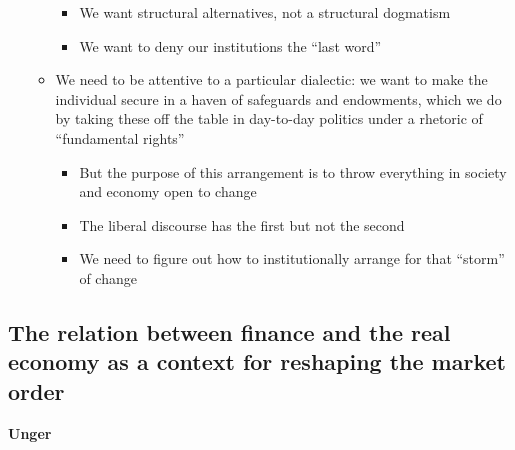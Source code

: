 \begin{itemize}
\begin{itemize}
    \begin{itemize}
    \tightlist
    \item
      We want structural alternatives, not a structural dogmatism
    \item
      We want to deny our institutions the ``last word''
    \end{itemize}
  \item
    We need to be attentive to a particular dialectic: we want to make
    the individual secure in a haven of safeguards and endowments, which
    we do by taking these off the table in day-to-day politics under a
    rhetoric of ``fundamental rights''

    \begin{itemize}
    \tightlist
    \item
      But the purpose of this arrangement is to throw everything in
      society and economy open to change
    \item
      The liberal discourse has the first but not the second
    \item
      We need to figure out how to institutionally arrange for that
      ``storm'' of change
    \end{itemize}
  \end{itemize}
\end{itemize}

\hypertarget{the-relation-between-finance-and-the-real-economy-as-a-context-for-reshaping-the-market-order}{%
\subsection{The relation between finance and the real economy as a
context for reshaping the market
order}\label{the-relation-between-finance-and-the-real-economy-as-a-context-for-reshaping-the-market-order}}

\textbf{Unger}

